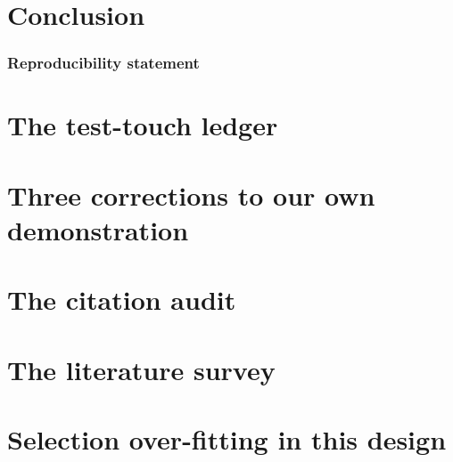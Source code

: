 \documentclass[12pt, a4paper]{article}
\begin{document}
\section{Conclusion}\label{sec:conclusion}


\subsubsection*{Reproducibility statement}





\appendix
\section{The test-touch ledger}\label{app:ledger}


\section{Three corrections to our own demonstration}\label{app:corrections}


\section{The citation audit}\label{app:citations}


\section{The literature survey}\label{app:survey}


\section{Selection over-fitting in this design}\label{app:selection}

\end{document}
